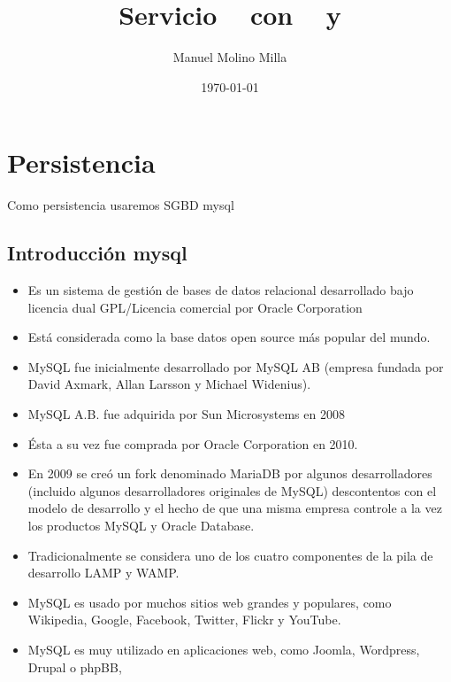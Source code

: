 \documentclass[4paper]{article}
\author{Manuel Molino Milla}
\title{\textbf{Servicio \R ~ con \N ~ y \s }}
\date{\today}
\newcommand{\M}{mysql}
\begin{document}
\maketitle 
\tableofcontents
\newpage

\section{Persistencia}
Como persistencia usaremos SGBD \M
\subsection{Introducción \M}
\begin{itemize}
\item Es un sistema de gestión de bases de datos relacional desarrollado bajo licencia dual GPL/Licencia comercial por Oracle Corporation 
\item Está considerada como la base datos open source más popular del mundo.
\item MySQL fue inicialmente desarrollado por MySQL AB (empresa fundada por David Axmark, Allan Larsson y Michael Widenius). 
\item MySQL A.B. fue adquirida por Sun Microsystems en 2008
\item Ésta a su vez fue comprada por Oracle Corporation en 2010.
\item En 2009 se creó un fork denominado MariaDB por algunos desarrolladores (incluido algunos desarrolladores originales de MySQL) descontentos con el modelo de desarrollo y el hecho de que una misma empresa controle a la vez los productos MySQL y Oracle Database.
\item  Tradicionalmente se considera uno de los cuatro componentes de la pila de desarrollo LAMP y WAMP.
\item MySQL es usado por muchos sitios web grandes y populares, como Wikipedia, Google, Facebook, Twitter, Flickr  y YouTube.
\item MySQL es muy utilizado en aplicaciones web, como Joomla, Wordpress, Drupal o phpBB,
\end{itemize}
\end{document}

